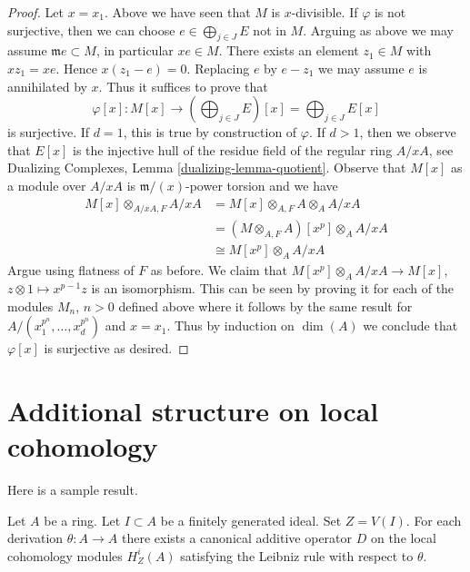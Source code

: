 \begin{proof}
\medskip\noindent
Let $x = x_1$. Above we have seen that $M$ is $x$-divisible.
If $\varphi$ is not surjective, then we can choose
$e \in \bigoplus_{j \in J} E$ not in $M$.
Arguing as above we may assume $\mathfrak m e \subset M$,
in particular $x e \in M$. There exists an element
$z_1 \in M$ with $x z_1 = x e$. Hence
$x(z_1 - e) = 0$. Replacing $e$ by $e - z_1$
we may assume $e$ is annihilated by $x$.
Thus it suffices to prove that
$$
\varphi[x] :
M[x]
\longrightarrow
\left(\bigoplus\nolimits_{j \in J} E\right)[x] =
\bigoplus\nolimits_{j \in J} E[x]
$$
is surjective. If $d = 1$, this is true by construction of $\varphi$.
If $d > 1$, then we observe that $E[x]$ is the injective hull
of the residue field of the regular ring $A/xA$, see
Dualizing Complexes, Lemma \ref{dualizing-lemma-quotient}.
Observe that $M[x]$ as a module over $A/xA$
is $\mathfrak m/(x)$-power torsion and we have
\begin{align*}
M[x] \otimes_{A/xA, F} A/xA
& = M[x] \otimes_{A, F} A \otimes_A A/xA \\
& = (M \otimes_{A, F} A)[x^p] \otimes_A A/xA \\
& \cong M[x^p] \otimes_A A/xA
\end{align*}
Argue using flatness of $F$ as before.
We claim that $M[x^p] \otimes_A A/xA \to M[x]$,
$z \otimes 1 \mapsto x^{p - 1}z$ is an isomorphism.
This can be seen by proving it for
each of the modules $M_n$, $n > 0$ defined above
where it follows by the same result for
$A/(x_1^{p^n}, \ldots, x_d^{p^n})$ and $x = x_1$.
Thus by induction on $\dim(A)$ we conclude that $\varphi[x]$
is surjective as desired.
\end{proof}





\section{Additional structure on local cohomology}
\label{section-additional}

\noindent
Here is a sample result.

\begin{lemma}
\label{lemma-derivation}
Let $A$ be a ring. Let $I \subset A$ be a finitely generated ideal.
Set $Z = V(I)$.
For each derivation $\theta : A \to A$ there exists a canonical
additive operator $D$ on the local cohomology modules
$H^i_Z(A)$ satisfying the Leibniz rule with respect to $\theta$.
\end{lemma}

